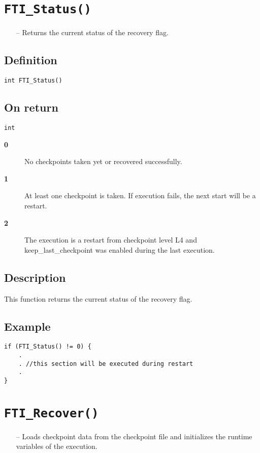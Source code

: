 \documentclass{refrep}
\begin{document}
\section{\tt FTI\_Status()}\label{sec:ftistatus}
\begin{framed}
\begin{itemize}
\item[--] Returns the current status of the recovery flag.
\end{itemize}
\end{framed}
\subsection*{Definition}
\begin{lstlisting}[frame=single]
int FTI_Status()
\end{lstlisting}
\subsection*{On return}
\begin{lstlisting}[frame=single]
int
\end{lstlisting}
\begin{description}
\item[\textbf{0}] No checkpoints taken yet or recovered successfully.
\item[\textbf{1}] At least one checkpoint is taken. If execution fails, the next start will be a restart.
\item[\textbf{2}] The execution is a restart from checkpoint level L4 and keep\_last\_checkpoint was enabled during the last execution.
\end{description}
\subsection*{Description}
This function returns the current status of the recovery flag.
\subsection*{Example}
\begin{center}
\begin{lstlisting}[frame=single]
if (FTI_Status() != 0) {
    .
    . //this section will be executed during restart
    .
}
\end{lstlisting}
\end{center}
\newpage
\section{\tt FTI\_Recover()}\label{sec:ftirecover}
\begin{framed}
\begin{itemize}
\item[--] Loads checkpoint data from the checkpoint file and initializes the runtime variables of the execution.
\end{itemize}
\end{framed}
\end{document}
